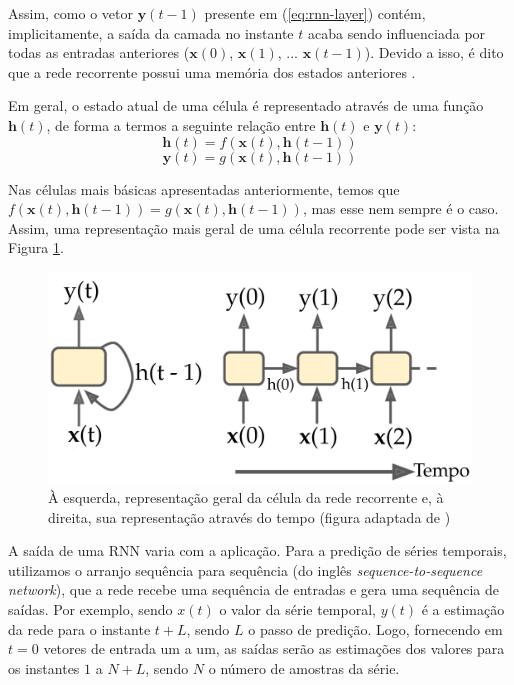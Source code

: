 \documentclass[a4paper, 12pt]{article}
\begin{document}
Assim, como o vetor $\mathbf{y}(t-1)$ presente em (\ref{eq:rnn-layer}) contém, implicitamente, a saída da camada no instante $t$ acaba sendo influenciada por todas as entradas anteriores ($\mathbf{x}(0)$, $\mathbf{x}(1)$, ... $\mathbf{x}(t-1)$). Devido a isso, é dito que a rede recorrente possui uma memória dos estados anteriores \cite{geron2019hands}. 

Em geral, o estado atual de uma célula é representado através de uma função $\mathbf{h}(t)$, de forma a termos a seguinte relação entre $\mathbf{h}(t)$ e $\mathbf{y}(t)$:
\begin{equation}
	\mathbf{h}(t) = f(\mathbf{x}(t), \mathbf{h}(t-1))
\end{equation}
\begin{equation}
	\mathbf{y}(t) = g(\mathbf{x}(t), \mathbf{h}(t-1))
\end{equation}

Nas células mais básicas apresentadas anteriormente, temos que $f(\mathbf{x}(t), \mathbf{h}(t-1)) = g(\mathbf{x}(t), \mathbf{h}(t-1))$, mas esse nem sempre é o caso. Assim, uma representação mais geral de uma célula recorrente pode ser vista na Figura \ref{fig:recorrente-cell-geral}.
\begin{figure}[!ht]
\centering
\includegraphics[scale = 0.25]{rnn-cell-general.pdf}
\caption{À esquerda, representação geral da célula da rede recorrente e, à direita, sua representação através do tempo (figura adaptada de \cite{geron2019hands})}
\label{fig:recorrente-cell-geral}
\end{figure}

A saída de uma RNN varia com a aplicação. Para a predição de séries temporais, utilizamos o arranjo sequência para sequência (do inglês \textit{sequence-to-sequence network}), que a rede recebe uma sequência de entradas e gera uma sequência de saídas. Por exemplo, sendo $x(t)$ o valor da série temporal, $y(t)$ é a estimação da rede para o instante $t + L$, sendo $L$ o passo de predição. Logo, fornecendo em $t=0$ vetores de entrada um a um, as saídas serão as estimações dos valores para os instantes $1$ a $N + L$, sendo $N$ o número de amostras da série. 
\end{document}
